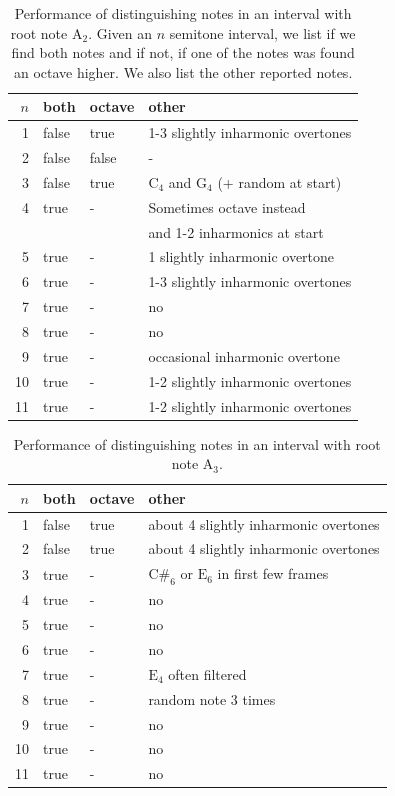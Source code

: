 \documentclass[10pt,twocolumn]{article}
\begin{document}
\begin{table}[H]%
    \centering
    \begin{tabular}{r|lll}
        $n$ & both & octave & other \\
        \hline
        1  & false & true & 1-3 slightly inharmonic overtones \\
        2  & false & false & - \\
        3  & false & true & $\text{C}_4$ and $\text{G}_4$ (+ random at start) \\
        4  & true & - & Sometimes octave instead\\ &&& and 1-2 inharmonics at start \\
        5  & true & - & 1 slightly inharmonic overtone \\
        6  & true & - & 1-3 slightly inharmonic overtones \\
        7  & true & - & no \\
        8  & true & - & no \\
        9  & true & - & occasional inharmonic overtone \\
        10 & true & - & 1-2 slightly inharmonic overtones \\
        11 & true & - & 1-2 slightly inharmonic overtones
    \end{tabular}
    \caption{Performance of distinguishing notes in an interval with root note $\text{A}_2$. Given an $n$ semitone interval, we list if we find both notes and if not, if one of the notes was found an octave higher. We also list the other reported notes.}
    \label{tab:polperf1}
\end{table}
\vspace{-3mm}
\begin{table}[H]
    \centering
    \begin{tabular}{r|lll}
        $n$ & both & octave & other \\
        \hline
        1  & false & true & about 4 slightly inharmonic overtones \\
        2  & false & true & about 4 slightly inharmonic overtones \\
        3  & true & - & $\text{C\#}_6$ or $\text{E}_6$ in first few frames \\
        4  & true & - & no \\
        5  & true & - & no \\
        6  & true & - & no \\
        7  & true & - & $\text{E}_4$ often filtered \\
        8  & true & - & random note 3 times \\
        9  & true & - & no \\
        10 & true & - & no \\
        11 & true & - & no
    \end{tabular}
    \caption{Performance of distinguishing notes in an interval with root note $\text{A}_3$.}
    \label{tab:polperf2}
\end{table}
\end{document}
